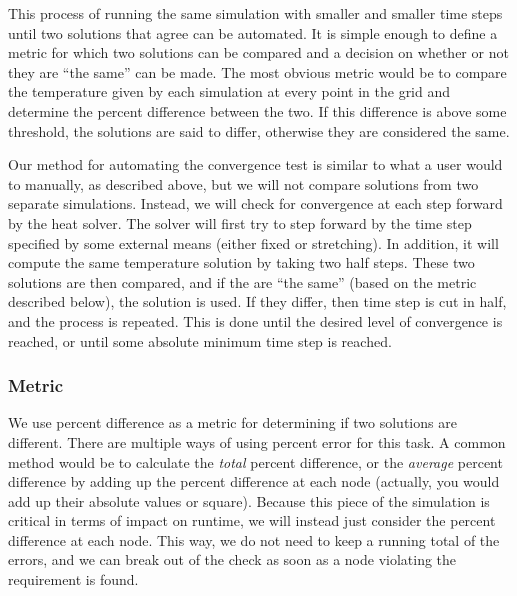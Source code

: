 \documentclass[letterpaper]{report}
\begin{document}
This process of running the same simulation with smaller and smaller time steps until two solutions that agree can be automated. It is simple enough
to define a metric for which two solutions can be compared and a decision on whether or not they are ``the same'' can be made. The most obvious metric
would be to compare the temperature given by each simulation at every point in the grid and determine the percent difference between the two. If this
difference is above some threshold, the solutions are said to differ, otherwise they are considered the same.

Our method for automating the convergence test is similar to what a user would to manually, as described above, but we will not compare solutions
from two separate simulations. Instead, we will check for convergence at each step forward by the heat solver. The solver will first try to step
forward by the time step specified by some external means (either fixed or stretching). In addition, it will compute the same temperature solution by
taking two half steps. These two solutions are then compared, and if the are ``the same'' (based on the metric described below), the solution is used.
If they differ, then time step is cut in half, and the process is repeated. This is done until the desired level of convergence is reached, or until
some absolute minimum time step is reached.

\subsubsection{Metric}
We use percent difference as a metric for determining if two solutions are different. There are multiple ways of using percent error for this task. A
common method would be to calculate the \emph{total} percent difference, or the \emph{average} percent difference by adding up the percent difference
at each node (actually, you would add up their absolute values or square). Because this piece of the simulation is critical in terms of impact on
runtime, we will instead just consider the percent difference at each node. This way, we do not need to keep a running total of the errors, and we can
break out of the check as soon as a node violating the requirement is found.
\end{document}
